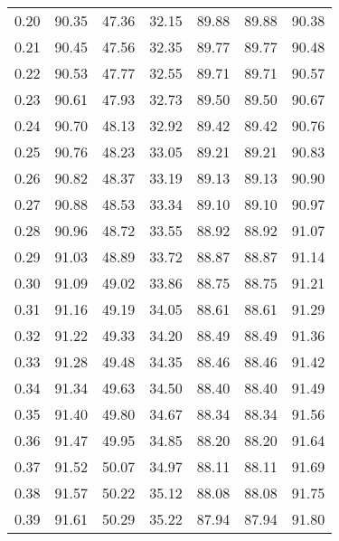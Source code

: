 \begin{tabular}{|c|c|c|c|c|c|c|}
      0.20 &     90.35 &     47.36 &      32.15 &   89.88 &      89.88 &         90.38 \\
      0.21 &     90.45 &     47.56 &      32.35 &   89.77 &      89.77 &         90.48 \\
      0.22 &     90.53 &     47.77 &      32.55 &   89.71 &      89.71 &         90.57 \\
      0.23 &     90.61 &     47.93 &      32.73 &   89.50 &      89.50 &         90.67 \\
      0.24 &     90.70 &     48.13 &      32.92 &   89.42 &      89.42 &         90.76 \\
      0.25 &     90.76 &     48.23 &      33.05 &   89.21 &      89.21 &         90.83 \\
      0.26 &     90.82 &     48.37 &      33.19 &   89.13 &      89.13 &         90.90 \\
      0.27 &     90.88 &     48.53 &      33.34 &   89.10 &      89.10 &         90.97 \\
      0.28 &     90.96 &     48.72 &      33.55 &   88.92 &      88.92 &         91.07 \\
      0.29 &     91.03 &     48.89 &      33.72 &   88.87 &      88.87 &         91.14 \\
      0.30 &     91.09 &     49.02 &      33.86 &   88.75 &      88.75 &         91.21 \\
      0.31 &     91.16 &     49.19 &      34.05 &   88.61 &      88.61 &         91.29 \\
      0.32 &     91.22 &     49.33 &      34.20 &   88.49 &      88.49 &         91.36 \\
      0.33 &     91.28 &     49.48 &      34.35 &   88.46 &      88.46 &         91.42 \\
      0.34 &     91.34 &     49.63 &      34.50 &   88.40 &      88.40 &         91.49 \\
      0.35 &     91.40 &     49.80 &      34.67 &   88.34 &      88.34 &         91.56 \\
      0.36 &     91.47 &     49.95 &      34.85 &   88.20 &      88.20 &         91.64 \\
      0.37 &     91.52 &     50.07 &      34.97 &   88.11 &      88.11 &         91.69 \\
      0.38 &     91.57 &     50.22 &      35.12 &   88.08 &      88.08 &         91.75 \\
      0.39 &     91.61 &     50.29 &      35.22 &   87.94 &      87.94 &         91.80 \\

\end{tabular}
